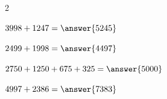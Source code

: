 \documentclass{ximera}
\begin{document}
\begin{oefening}{\oefU\ESS}
\begin{multicols}{2}
    \begin{question} \(3998+1247=\answer{5245}\) \end{question}
    
    \begin{question} \(2499+1998=\answer{4497}\) \end{question}
    
    \begin{question} \(2750+1250+675+325=\answer{5000}\) \end{question}
    
    \begin{question} \(4997+2386=\answer{7383}\) \end{question}
    
    \end{multicols}
    
    \end{oefening}
\end{document}

